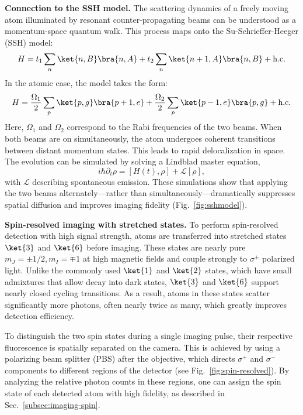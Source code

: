 \textbf{Connection to the SSH model.}  
The scattering dynamics of a freely moving atom illuminated by resonant counter-propagating beams can be understood as a momentum-space quantum walk. This process maps onto the Su-Schrieffer-Heeger (SSH) model:
\begin{equation*}
	H = t_1 \sum_n \ket{n,B}\bra{n,A} + t_2 \sum_n \ket{n+1,A}\bra{n,B} + \text{h.c.}
\end{equation*}
In the atomic case, the model takes the form:
\begin{equation*}
	H = \frac{\Omega_1}{2} \sum_p \ket{p,g}\bra{p+1,e} + \frac{\Omega_2}{2} \sum_p \ket{p-1,e}\bra{p,g} + \text{h.c.}
\end{equation*}
Here, $\Omega_1$ and $\Omega_2$ correspond to the Rabi frequencies of the two beams. When both beams are on simultaneously, the atom undergoes coherent transitions between distant momentum states. This leads to rapid delocalization in space. The evolution can be simulated by solving a Lindblad master equation,
\begin{equation*}
	i \hbar \partial_t \rho = [H(t), \rho] + \mathcal{L}[\rho],
\end{equation*}
with $\mathcal{L}$ describing spontaneous emission. These simulations show that applying the two beams alternately—rather than simultaneously—dramatically suppresses spatial diffusion and improves imaging fidelity (Fig.~\ref{fig:sshmodel}).

\textbf{Spin-resolved imaging with stretched states.}  
To perform spin-resolved detection with high signal strength, atoms are transferred into stretched states $\ket{3}$ and $\ket{6}$ before imaging. These states are nearly pure $m_J = \pm 1/2, m_I = \mp 1$ at high magnetic fields and couple strongly to $\sigma^\pm$ polarized light. Unlike the commonly used $\ket{1}$ and $\ket{2}$ states, which have small admixtures that allow decay into dark states, $\ket{3}$ and $\ket{6}$ support nearly closed cycling transitions. As a result, atoms in these states scatter significantly more photons, often nearly twice as many, which greatly improves detection efficiency.

To distinguish the two spin states during a single imaging pulse, their respective fluorescence is spatially separated on the camera. This is achieved by using a polarizing beam splitter (PBS) after the objective, which directs $\sigma^+$ and $\sigma^-$ components to different regions of the detector (see Fig.~\ref{fig:spin-resolved}). By analyzing the relative photon counts in these regions, one can assign the spin state of each detected atom with high fidelity, as described in Sec.~\ref{subsec:imaging-spin}.

